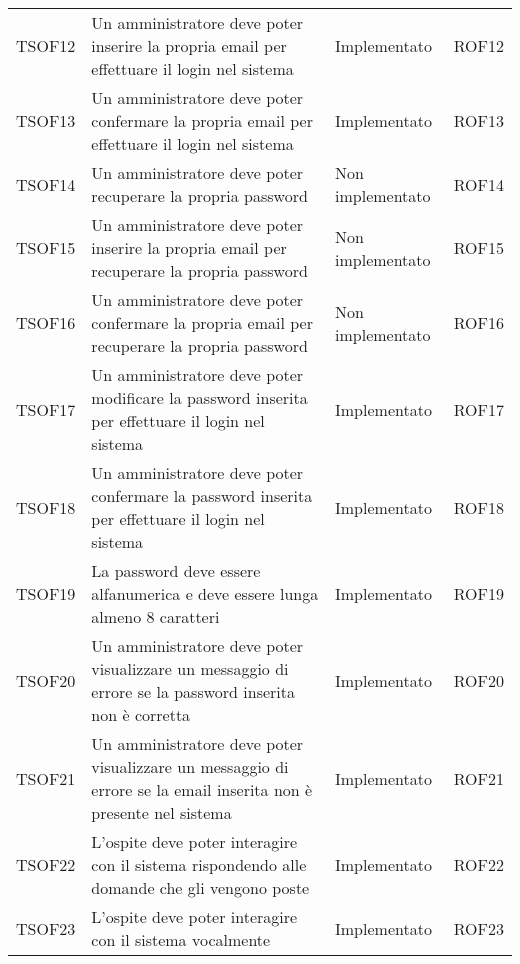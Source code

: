 \documentclass[../PianoDiQualifica_v3.0.0.tex]{subfiles}
\begin{document}
\begin{longtable}[c] { >{\centering\arraybackslash}p{2cm} p{7cm} >{\centering\arraybackslash}p{4cm} >{\centering\arraybackslash}p{2cm}}
			\addlinespace[0.3em]
			\midrule
			\addlinespace[0.3em]
			TSOF12 & Un amministratore deve poter inserire la propria email per effettuare il login nel sistema & Implementato & ROF12 \\
			\addlinespace[0.3em]
			\midrule
			\addlinespace[0.3em]
			TSOF13 & Un amministratore deve poter confermare la propria email per effettuare il login nel sistema & Implementato & ROF13 \\
			\addlinespace[0.3em]
			\midrule
			\addlinespace[0.3em]
			TSOF14 & Un amministratore deve poter recuperare la propria password & Non implementato & ROF14 \\
			\addlinespace[0.3em]
			\midrule
			\addlinespace[0.3em]
			TSOF15 & Un amministratore deve poter inserire la propria email per recuperare la propria password & Non implementato & ROF15 \\
			\addlinespace[0.3em]
			\midrule
			\addlinespace[0.3em]
			TSOF16 & Un amministratore deve poter confermare la propria email per recuperare la propria password & Non implementato & ROF16 \\
			\addlinespace[0.3em]
			\midrule
			\addlinespace[0.3em]
			TSOF17 & Un amministratore deve poter modificare la password inserita per effettuare il login nel sistema	& Implementato & ROF17 \\
			\addlinespace[0.3em]
			\midrule
			\addlinespace[0.3em]
			TSOF18 & Un amministratore deve poter confermare la password inserita per effettuare il login nel sistema & Implementato & ROF18 \\
			\addlinespace[0.3em]
			\midrule
			\addlinespace[0.3em]
			TSOF19 & La password deve essere alfanumerica e deve essere lunga almeno 8 caratteri & Implementato & ROF19 \\
			\addlinespace[0.3em]
			\midrule
			\addlinespace[0.3em]
			TSOF20 & Un amministratore deve poter visualizzare un messaggio di errore se la password inserita non è corretta & Implementato & ROF20 \\
			\addlinespace[0.3em]
			\midrule
			\addlinespace[0.3em]
			TSOF21 & Un amministratore deve poter visualizzare un messaggio di errore se la email inserita non è presente nel sistema & Implementato & ROF21 \\
			\addlinespace[0.3em]
			\midrule
			\addlinespace[0.3em]
			TSOF22 & L'ospite deve poter interagire con il sistema rispondendo alle domande che gli vengono poste & Implementato & ROF22 \\
			\addlinespace[0.3em]
			\midrule
			\addlinespace[0.3em]
			TSOF23 & L'ospite deve poter interagire con il sistema vocalmente & Implementato & ROF23 \\

\end{longtable}
\end{document}

